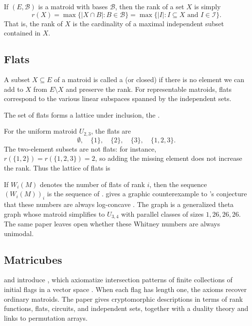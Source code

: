 If $(E,\mathcal{B})$ is a matroid with bases $\mathcal{B}$,
then the rank of a set $X$ is simply
\[
  r(X)
  =
  \max \{ |X \cap B| : B \in \mathcal{B} \}
  =
  \max \{ |I| : I \subseteq X \text{ and } I \in \mathcal{I} \}.
\]
That is, the rank of $X$ is the cardinality of a maximal independent subset
contained in $X$.


\subsection[matroidFlats]{Flats}

A subset $X \subseteq E$ of a matroid is called a
\label{matroidFlat} (or closed) if there is no element we can add
to $X$ from $E \setminus X$ and preserve the rank.  For representable matroids,
flats correspond to the various linear subspaces spanned by the independent
sets.

The set of flats forms a lattice under inclusion, the
\label{latticeOfFlats}.

\begin{example}
For the uniform matroid $U_{2,3}$, the flats are
\[
  \emptyset,\quad \{1\},\quad \{2\},\quad \{3\},\quad \{1,2,3\}.
\]
The two-element subsets are not flats: for instance,
$r(\{1,2\})=r(\{1,2,3\})=2$, so adding the missing element does not increase
the rank.  Thus the lattice of flats is
\begin{figure}
\end{figure}
\end{example}

If $W_i(M)$ denotes the number of flats of rank $i$, then the sequence
$(W_i(M))_i$ is the sequence of 
\label{whitneyNumbersSecondKind}.
 gives a graphic counterexample to 's
conjecture that these numbers are always log-concave \cite{Larson2026x}.
The graph is a generalized theta graph whose matroid simplifies to $U_{3,4}$
with parallel classes of sizes $1,26,26,26$.  The same paper leaves open
whether these Whitney numbers are always unimodal.


\subsection[matricubes]{Matricubes}

 and  introduce
, which axiomatize intersection patterns of finite
collections of initial flags in a vector space \cite{AminiGierczak2024x}.
When each flag has length one, the axioms recover ordinary matroids.  The
paper gives cryptomorphic descriptions in terms of rank functions, flats,
circuits, and independent sets, together with a duality theory and links to
permutation arrays.




